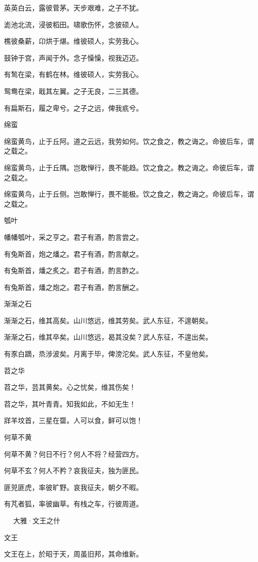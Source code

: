 英英白云，露彼菅茅。天步艰难，之子不犹。

滮池北流，浸彼稻田。啸歌伤怀，念彼硕人。

樵彼桑薪，卬烘于煁。维彼硕人，实劳我心。

鼓钟于宫，声闻于外。念子懆懆，视我迈迈。

有鹙在梁，有鹤在林。维彼硕人，实劳我心。

鸳鸯在梁，戢其左翼。之子无良，二三其德。

有扁斯石，履之卑兮。之子之远，俾我疧兮。

绵蛮

绵蛮黄鸟，止于丘阿。道之云远，我劳如何。饮之食之，教之诲之。命彼后车，谓之载之。

绵蛮黄鸟，止于丘隅。岂敢惮行，畏不能趋。饮之食之。教之诲之。命彼后车，谓之载之。

绵蛮黄鸟，止于丘侧。岂敢惮行，畏不能极。饮之食之，教之诲之。命彼后车，谓之载之。

瓠叶

幡幡瓠叶，采之亨之。君子有酒，酌言尝之。

有兔斯首，炮之燔之。君子有酒，酌言献之。

有兔斯首，燔之炙之。君子有酒，酌言酢之。

有兔斯首，燔之炮之。君子有酒，酌言酬之。

渐渐之石

渐渐之石，维其高矣。山川悠远，维其劳矣。武人东征，不遑朝矣。

渐渐之石，维其卒矣。山川悠远，曷其没矣？武人东征，不遑出矣。

有豕白蹢，烝涉波矣。月离于毕，俾滂沱矣。武人东征，不皇他矣。

苕之华

苕之华，芸其黄矣。心之忧矣，维其伤矣！

苕之华，其叶青青。知我如此，不如无生！

牂羊坟首，三星在罶。人可以食，鲜可以饱！

何草不黄

何草不黄？何日不行？何人不将？经营四方。

何草不玄？何人不矜？哀我征夫，独为匪民。

匪兕匪虎，率彼旷野。哀我征夫，朝夕不暇。

有芃者狐，率彼幽草。有栈之车，行彼周道。



　
大雅·文王之什


文王

文王在上，於昭于天，周虽旧邦，其命维新。


